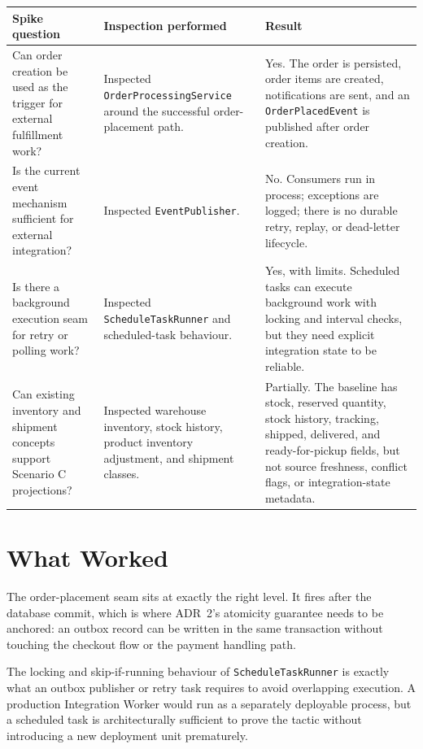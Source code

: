 \begingroup
\small
\setlength{\tabcolsep}{4pt}
\renewcommand{\arraystretch}{1.15}
\begin{center}
\begin{tabular}{|p{}|p{}|p{}|}
\hline
\textbf{Spike question} & \textbf{Inspection performed} & \textbf{Result} \\
\hline
Can order creation be used as the trigger for external fulfillment work? &
Inspected \texttt{OrderProcessingService} around the successful order-placement path. &
Yes. The order is persisted, order items are created, notifications are sent, and an
\texttt{OrderPlacedEvent} is published after order creation. \\
\hline
Is the current event mechanism sufficient for external integration? &
Inspected \texttt{EventPublisher}. &
No. Consumers run in process; exceptions are logged; there is no durable retry, replay, or
dead-letter lifecycle. \\
\hline
Is there a background execution seam for retry or polling work? &
Inspected \texttt{ScheduleTaskRunner} and scheduled-task behaviour. &
Yes, with limits. Scheduled tasks can execute background work with locking and interval checks,
but they need explicit integration state to be reliable. \\
\hline
Can existing inventory and shipment concepts support Scenario C projections? &
Inspected warehouse inventory, stock history, product inventory adjustment, and shipment classes. &
Partially. The baseline has stock, reserved quantity, stock history, tracking, shipped,
delivered, and ready-for-pickup fields, but not source freshness, conflict flags, or
integration-state metadata. \\
\hline
\end{tabular}
\end{center}
\endgroup

\section{What Worked}

The order-placement seam sits at exactly the right level. It fires after the database commit,
which is where ADR~2's atomicity guarantee needs to be anchored: an outbox record can be
written in the same transaction without touching the checkout flow or the payment handling path.

The locking and skip-if-running behaviour of \texttt{ScheduleTaskRunner} is exactly what an
outbox publisher or retry task requires to avoid overlapping execution. A production Integration
Worker would run as a separately deployable process, but a scheduled task is architecturally
sufficient to prove the tactic without introducing a new deployment unit prematurely.

